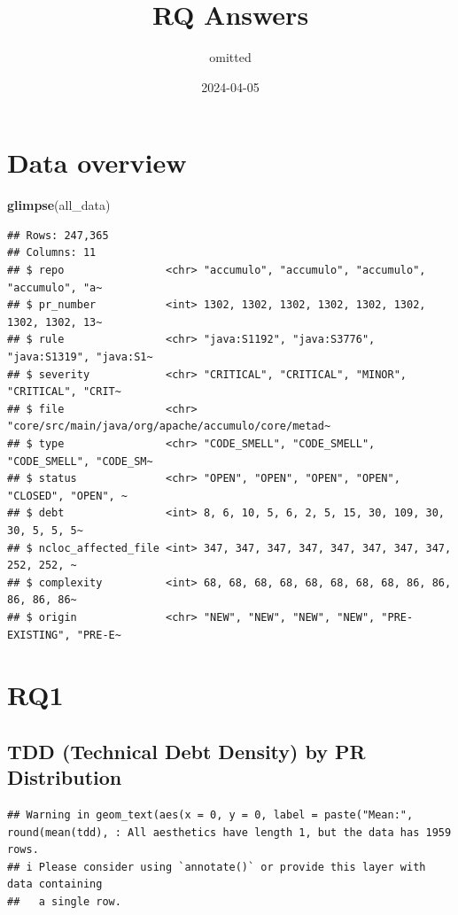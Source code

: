 \documentclass[
]{article}
\title{RQ Answers}
\author{omitted}
\date{2024-04-05}
\newenvironment{Shaded}{\begin{snugshade}}{\end{snugshade}}
\newcommand{\FunctionTok}[1]{\textcolor[rgb]{0.13,0.29,0.53}{\textbf{#1}}}
\newcommand{\NormalTok}[1]{#1}
\begin{document}
\maketitle

\section{Data overview}\label{data-overview}

\begin{Shaded}
\begin{Highlighting}[]
\FunctionTok{glimpse}\NormalTok{(all\_data)}
\end{Highlighting}
\end{Shaded}

\begin{verbatim}
## Rows: 247,365
## Columns: 11
## $ repo                <chr> "accumulo", "accumulo", "accumulo", "accumulo", "a~
## $ pr_number           <int> 1302, 1302, 1302, 1302, 1302, 1302, 1302, 1302, 13~
## $ rule                <chr> "java:S1192", "java:S3776", "java:S1319", "java:S1~
## $ severity            <chr> "CRITICAL", "CRITICAL", "MINOR", "CRITICAL", "CRIT~
## $ file                <chr> "core/src/main/java/org/apache/accumulo/core/metad~
## $ type                <chr> "CODE_SMELL", "CODE_SMELL", "CODE_SMELL", "CODE_SM~
## $ status              <chr> "OPEN", "OPEN", "OPEN", "OPEN", "CLOSED", "OPEN", ~
## $ debt                <int> 8, 6, 10, 5, 6, 2, 5, 15, 30, 109, 30, 30, 5, 5, 5~
## $ ncloc_affected_file <int> 347, 347, 347, 347, 347, 347, 347, 347, 252, 252, ~
## $ complexity          <int> 68, 68, 68, 68, 68, 68, 68, 68, 86, 86, 86, 86, 86~
## $ origin              <chr> "NEW", "NEW", "NEW", "NEW", "PRE-EXISTING", "PRE-E~
\end{verbatim}

\section{RQ1}\label{rq1}

\subsection{TDD (Technical Debt Density) by PR
Distribution}\label{tdd-technical-debt-density-by-pr-distribution}

\begin{verbatim}
## Warning in geom_text(aes(x = 0, y = 0, label = paste("Mean:", round(mean(tdd), : All aesthetics have length 1, but the data has 1959 rows.
## i Please consider using `annotate()` or provide this layer with data containing
##   a single row.
\end{verbatim}
\end{document}
